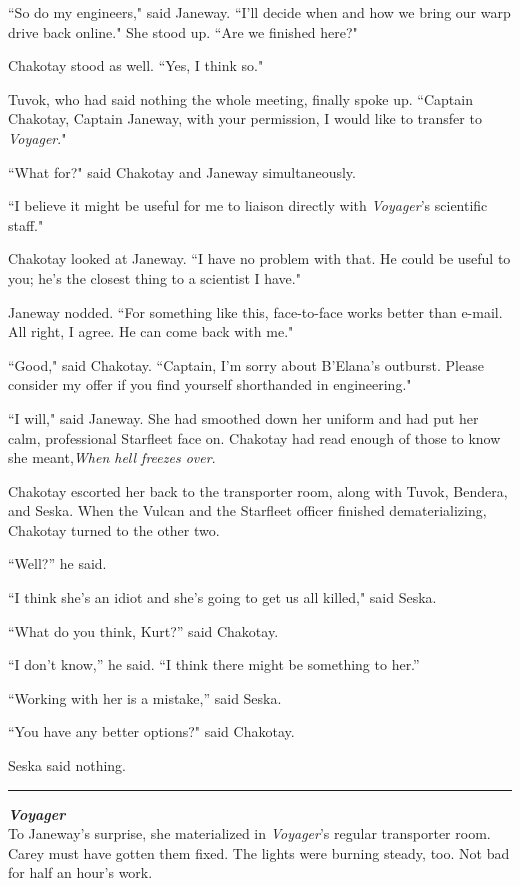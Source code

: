 \documentclass[twoside,letterpaper,12pt]{memoir}
\begin{document}
``So do my engineers," said Janeway. ``I'll decide when and how we bring our warp drive back online." She stood up. ``Are we finished here?"

Chakotay stood as well. ``Yes, I think so."

Tuvok, who had said nothing the whole meeting, finally spoke up. ``Captain Chakotay, Captain Janeway, with your permission, I would like to transfer to \textit{Voyager}."

``What for?" said Chakotay and Janeway simultaneously.

``I believe it might be useful for me to liaison directly with \textit{Voyager}'s scientific staff."

Chakotay looked at Janeway. ``I have no problem with that. He could be useful to you; he's the closest thing to a scientist I have."

Janeway nodded. ``For something like this, face-to-face works better than e-mail. All right, I agree. He can come back with me."

``Good," said Chakotay. ``Captain, I'm sorry about B'Elana's outburst. Please consider my offer if you find yourself shorthanded in engineering."

``I will," said Janeway. She had smoothed down her uniform and had put her calm, professional Starfleet face on. Chakotay had read enough of those to know she meant,\textit{When hell freezes over}.

Chakotay escorted her back to the transporter room, along with Tuvok, Bendera, and Seska. When the Vulcan and the Starfleet officer finished dematerializing, Chakotay turned to the other two.

``Well?'' he said.

``I think she's an idiot and she's going to get us all killed," said Seska.

``What do you think, Kurt?'' said Chakotay.

``I don’t know,'' he said. ``I think there might be something to her.''

``Working with her is a mistake,'' said Seska.

``You have any better options?" said Chakotay.

Seska said nothing.

\fancybreak{\rule{3cm}{0.4 pt}}
\noindent\textbf{\textit{Voyager}}\\

To Janeway's surprise, she materialized in \textit{Voyager}'s regular transporter room. Carey must have gotten them fixed. The lights were burning steady, too. Not bad for half an hour's work.
\end{document}
